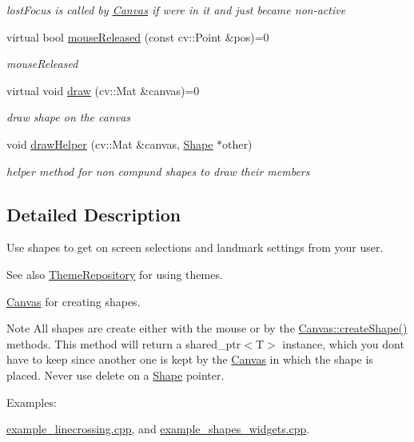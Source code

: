 \begin{DoxyCompactItemize}
\begin{DoxyCompactList}\small\item\em lost\+Focus is called by \hyperlink{classcanvascv_1_1Canvas}{Canvas} if we\textquotesingle{}re in it and just became non-\/active \end{DoxyCompactList}\item 
virtual bool \hyperlink{classcanvascv_1_1Shape_a8cbe386ff880c9830c0e4a97b335abf0}{mouse\+Released} (const cv\+::\+Point \&pos)=0
\begin{DoxyCompactList}\small\item\em mouse\+Released \end{DoxyCompactList}\item 
virtual void \hyperlink{classcanvascv_1_1Shape_ab064fdb03d0d94ce84bde0b76b9e62c0}{draw} (cv\+::\+Mat \&canvas)=0
\begin{DoxyCompactList}\small\item\em draw shape on the canvas \end{DoxyCompactList}\item 
void \hyperlink{classcanvascv_1_1Shape_a020a0b73278de5db5404b662b6a41363}{draw\+Helper} (cv\+::\+Mat \&canvas, \hyperlink{classcanvascv_1_1Shape}{Shape} $\ast$other)\hypertarget{classcanvascv_1_1Shape_a020a0b73278de5db5404b662b6a41363}{}\label{classcanvascv_1_1Shape_a020a0b73278de5db5404b662b6a41363}

\begin{DoxyCompactList}\small\item\em helper method for non compund shapes to draw their members \end{DoxyCompactList}\end{DoxyCompactItemize}


\subsection{Detailed Description}
Use shapes to get on screen selections and landmark settings from your user. \begin{DoxySeeAlso}{See also}
\hyperlink{classcanvascv_1_1ThemeRepository}{Theme\+Repository} for using themes. 

\hyperlink{classcanvascv_1_1Canvas}{Canvas} for creating shapes. 
\end{DoxySeeAlso}
\begin{DoxyNote}{Note}
All shapes are create either with the mouse or by the \hyperlink{classcanvascv_1_1Canvas_a630ac92458f1718d0c597e96dd5a4aef}{Canvas\+::create\+Shape()} methods. This method will return a shared\+\_\+ptr$<$\+T$>$ instance, which you don\textquotesingle{}t have to keep since another one is kept by the \hyperlink{classcanvascv_1_1Canvas}{Canvas} in which the shape is placed. Never use delete on a \hyperlink{classcanvascv_1_1Shape}{Shape} pointer. 
\end{DoxyNote}
\begin{Desc}
\item[Examples\+: ]\par
\hyperlink{example_linecrossing_8cpp-example}{example\+\_\+linecrossing.\+cpp}, and \hyperlink{example_shapes_widgets_8cpp-example}{example\+\_\+shapes\+\_\+widgets.\+cpp}.\end{Desc}


